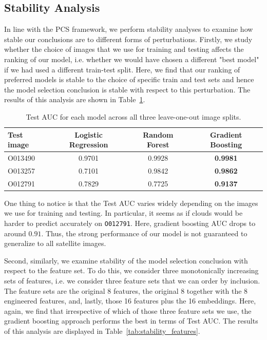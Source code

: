 \documentclass[10pt,letterpaper]{article}
\begin{document}
\subsection{Stability Analysis}

In line with the PCS framework, we perform stability analyses to examine how stable our conclusions are to different forms of perturbations. Firstly, we study whether the choice of images that we use for training and testing affects the ranking of our model, i.e. whether we would have chosen a different "best model" if we had used a different train-test split. Here, we find that our ranking of preferred models is stable to the choice of specific train and test sets and hence the model selection conclusion is stable with respect to this perturbation. The results of this analysis are shown in Table~\ref{tab:stability_loo}.

\begin{table}[htbp]
\centering
\small
\caption{Test AUC for each model across all three leave-one-out image splits.}
\label{tab:stability_loo}
\begin{tabular}{lccc}
\toprule
Test image & Logistic Regression & Random Forest & Gradient Boosting \\
\midrule
O013490 & 0.9701 & 0.9928 & \textbf{0.9981} \\
O013257 & 0.7101 & 0.9842 & \textbf{0.9862} \\
O012791 & 0.7829 & 0.7725 & \textbf{0.9137} \\
\bottomrule
\end{tabular}
\end{table}

One thing to notice is that the Test AUC varies widely depending on the images we use for training and testing. In particular, it seems as if clouds would be harder to predict accurately on \texttt{O012791}. Here, gradient boosting AUC drops to around $0.91$. Thus, the strong performance of our model is not guaranteed to generalize to all satellite images.

Second, similarly, we examine stability of the model selection conclusion with respect to the feature set. To do this, we consider three monotonically increasing sets of features, i.e. we consider three feature sets that we can order by inclusion. The feature sets are the original 8 features, the original 8 together with the 8 engineered features, and, lastly, those 16 features plus the 16 embeddings. Here, again, we find that irrespective of which of those three feature sets we use, the gradient boosting approach performs the best in terms of Test AUC. The results of this analysis are displayed in Table~\ref{tab:stability_features}.
\end{document}
